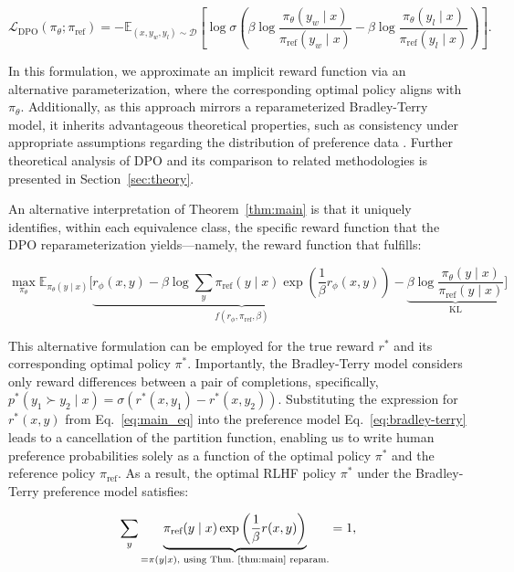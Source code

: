 \begin{equation}\label{eq:optimum_model}
    \mathcal{L}_\text{DPO}(\pi_{\theta}; \pi_\text{ref}) = -\mathbb{E}_{(x, y_w, y_l)\sim \mathcal{D}}\left[\log \sigma \left(\beta \log \frac{\pi_{\theta}(y_w\mid x)}{\pi_\text{ref}(y_w\mid x)} - \beta \log \frac{\pi_{\theta}(y_l\mid x)}{\pi_\text{ref}(y_l\mid x)}\right)\right].
\end{equation}

In this formulation, we approximate an implicit reward function via an alternative parameterization, where the corresponding optimal policy aligns with $\pi_\theta$. Additionally, as this approach mirrors a reparameterized Bradley-Terry model, it inherits advantageous theoretical properties, such as consistency under appropriate assumptions regarding the distribution of preference data \cite{bong2022generalized}. Further theoretical analysis of DPO and its comparison to related methodologies is presented in Section~\ref{sec:theory}.

An alternative interpretation of Theorem~\ref{thm:main} is that it uniquely identifies, within each equivalence class, the specific reward function that the DPO reparameterization yields—namely, the reward function that fulfills:

\begin{equation}\label{eq:AC}
    \max_{\pi_{\theta}}\mathbb{E}_{\pi_{\theta}(y\mid x)}\bigg[\underbrace{r_{\phi}(x, y) -\beta\log\sum_{y}\pi_\text{ref}(y\mid x)\exp\left(\frac{1}{\beta}r_{\phi}(x, y)\right)}_{f(r_{\phi}, \pi_\text{ref}, \beta)} - \underbrace{\beta\log\frac{\pi_{\theta}(y\mid x)}{\pi_\text{ref}(y\mid x)}}_{\text{KL}}\bigg]
\end{equation}

This alternative formulation can be employed for the true reward $r^*$ and its corresponding optimal policy $\pi^*$. Importantly, the Bradley-Terry model considers only reward differences between a pair of completions, specifically, ${p^*(y_1 \succ y_2 \mid x) = \sigma(r^*(x, y_1) - r^*(x, y_2))}$. Substituting the expression for $r^*(x,y)$ from Eq.~\ref{eq:main_eq} into the preference model Eq.~\ref{eq:bradley-terry} leads to a cancellation of the partition function, enabling us to write human preference probabilities solely as a function of the optimal policy $\pi^*$ and the reference policy $\pi_\text{ref}$. As a result, the optimal RLHF policy $\pi^*$ under the Bradley-Terry preference model satisfies:

\begin{equation}\label{eq:lag_p}
     \sum_{y}\underbrace{\pi_\text{ref}(y\mid x)\exp\left(\frac{1}{\beta}r(x, y)\right)}_{=\pi(y\mid x)\text{, using Thm.~\ref{thm:main} reparam.}} = 1,
\end{equation}

